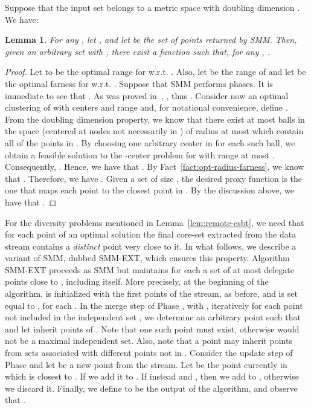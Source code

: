 \documentclass{article}
\newtheorem{lemma}{Lemma}
\begin{document}
Suppose that the input set  belongs to a metric space with doubling
dimension . We have:
\begin{lemma}\label{lem:smm-properties}
  For any , let ,
  and let  be the set of points returned by {\sc SMM}. Then, given an arbitrary set  with ,
  there exist a function  such that, for any
  , .
\end{lemma}
\begin{proof}
  Let  to be the optimal range for  w.r.t. .  Also,
  let  be the range of  and let
   be the optimal farness for  w.r.t. .  Suppose that
  {\sc SMM} performs  phases.  It is immediate to
  see that . As was proved in~\cite{CharikarCFM04},
  , thus . Consider now
  an optimal clustering of  with  centers and range  and,
  for notational convenience, define . From
  the doubling dimension property, we know that there exist at most
   balls in the space (centered at nodes not necessarily in )
  of radius at most  which contain all of the points
  in . By choosing one arbitrary center in  for each such ball,
  we obtain a feasible solution to the -center problem for 
  with range at most . Consequently,
  . Hence, we have that
  . By
  Fact~\ref{fact:opt-radius-farness}, we know that
  . Therefore, we have
  .  Given a
  set  of size , the desired proxy function
   is the one that maps each point  to the closest
  point in . By the discussion above, we have that
  .
\end{proof}

For the diversity problems mentioned in Lemma~\ref{lem:remote-csbt},
we need that for each point of an optimal solution the final core-set
extracted from the data stream contains a \emph{distinct} point very
close to it.  In what follows, we describe a variant of {\sc SMM},
dubbed {\sc SMM-EXT}, which ensures this property. Algorithm {\sc
  SMM-EXT} proceeds as {\sc SMM} but maintains for each  a set
 of at most  delegate points close to , including 
itself. More precisely, at the beginning of the algorithm,  is
initialized with the first  points of the stream, as before, and
 is set equal to , for each . In the merge step
of Phase , with , iteratively for each point  not
included in the independent set , we determine an arbitrary point
 such that  and let  inherit
 points of . Note that one
such point  must exist, otherwise  would not be a maximal
independent set. Also, note that a point  may inherit
points from sets associated with different points not in . Consider
the update step of Phase  and let  be a new point from the
stream. Let  be the point currently in  which is closest
to . If  we add it to . If instead
 and , then we add  to , otherwise
we discard it. Finally, we define  to be the
output of the algorithm, and observe that .
\end{document}
